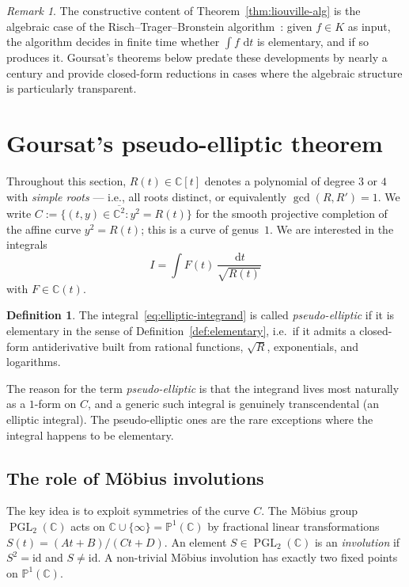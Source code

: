 \documentclass[11pt,a4paper]{article}
\theoremstyle{plain}
\theoremstyle{definition}
\newtheorem{definition}[theorem]{Definition}
\theoremstyle{remark}
\newtheorem{remark}[theorem]{Remark}
\newcommand{\C}{\mathbb{C}}
\newcommand{\PGL}{\operatorname{PGL}}
\renewcommand{\d}{\,\mathrm{d}}
\begin{document}
\begin{remark}
The constructive content of Theorem~\ref{thm:liouville-alg} is the algebraic case of the Risch--Trager--Bronstein algorithm~\cite{Risch1969,Risch1970,Davenport1981,Trager1984,Bronstein2005}: given $f\in K$ as input, the algorithm decides in finite time whether $\int f\,\d t$ is elementary, and if so produces it. Goursat's theorems below predate these developments by nearly a century and provide closed-form reductions in cases where the algebraic structure is particularly transparent.
\end{remark}


\section{Goursat's pseudo-elliptic theorem}
\label{sec:goursat}

Throughout this section, $R(t)\in\C[t]$ denotes a polynomial of degree $3$ or $4$ with \emph{simple roots} — i.e., all roots distinct, or equivalently $\gcd(R,R') = 1$. We write $C := \{(t,y)\in\overline{\C^2} : y^2 = R(t)\}$ for the smooth projective completion of the affine curve $y^2=R(t)$; this is a curve of genus~$1$. We are interested in the integrals
\begin{equation}\label{eq:elliptic-integrand}
  I = \int F(t)\,\frac{\d t}{\sqrt{R(t)}}
\end{equation}
with $F\in\C(t)$.

\begin{definition}\label{def:pseudo-elliptic}
The integral~\eqref{eq:elliptic-integrand} is called \emph{pseudo-elliptic} if it is elementary in the sense of Definition~\ref{def:elementary}, i.e.\ if it admits a closed-form antiderivative built from rational functions, $\sqrt{R}$, exponentials, and logarithms.
\end{definition}

The reason for the term \emph{pseudo-elliptic} is that the integrand lives most naturally as a $1$-form on $C$, and a generic such integral is genuinely transcendental (an elliptic integral). The pseudo-elliptic ones are the rare exceptions where the integral happens to be elementary.

\subsection{The role of M\"obius involutions}

The key idea is to exploit symmetries of the curve $C$. The M\"obius group $\PGL_2(\C)$ acts on $\C\cup\{\infty\}=\mathbb{P}^1(\C)$ by fractional linear transformations $S(t) = (At+B)/(Ct+D)$. An element $S \in \PGL_2(\C)$ is an \emph{involution} if $S^2 = \mathrm{id}$ and $S\neq \mathrm{id}$. A non-trivial M\"obius involution has exactly two fixed points on $\mathbb{P}^1(\C)$.
\end{document}
